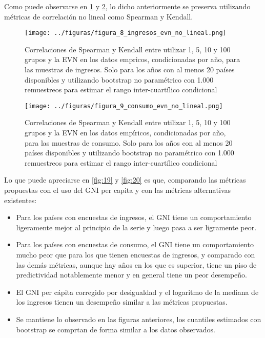 Como puede observarse en \ref{fig:8} y \ref{fig:9}, lo dicho anteriormente se preserva utilizando métricas de correlación no lineal como Spearman y Kendall.

\begin{figure}[H] %
    \centering %
    \texttt{[image: ../figuras/figura\_8\_ingresos\_evn\_no\_lineal.png]} %
    \caption{Correlaciones de Spearman y Kendall entre utilizar 1, 5, 10 y 100 grupos y la EVN en los datos empricos, condicionadas por año, para las muestras de ingresos. Solo para los años con al menos 20 países disponibles y utilizando bootstrap no paramétrico con 1.000 remuestreos para estimar el rango inter-cuartílico condicional}
    \label{fig:8} %
\end{figure}



\begin{figure}[H] %
    \centering %
    \texttt{[image: ../figuras/figura\_9\_consumo\_evn\_no\_lineal.png]} %
    \caption{Correlaciones de Spearman y Kendall entre utilizar 1, 5, 10 y 100 grupos y la EVN en los datos empíricos, condicionadas por año, para las muestras de consumo. Solo para los años con al menos 20 países disponibles y utilizando bootstrap no paramétrico con 1.000 remuestreos para estimar el rango inter-cuartílico condicional}
    \label{fig:9} %
\end{figure}

Lo que puede apreciarse en \ref{fig:19} y \ref{fig:20} es que, comparando las métricas propuestas con el uso del GNI per capita y con las métricas alternativas existentes:


\begin{itemize}
    \item  Para los países con encuestas de ingresos, el GNI tiene un comportamiento ligeramente mejor al principio de la serie y luego pasa a ser ligramente peor.
    \item Para los países con encuestas de consumo, el GNI tiene un comportamiento mucho peor que para los que tienen encuestas de ingresos, y comparado con las demás métricas, aunque hay años en los que es superior, tiene un piso de predictividad notablemente menor y en general tiene un peor desempeño.
    \item El GNI per cápita corregido por desigualdad y el logaritmo de la mediana de los ingresos tienen un desempeño similar a las métricas propuestas.
    \item Se mantiene lo observado en las figuras anteriores, los cuantiles estimados con bootstrap se comprtan de forma similar a los datos observados.
\end{itemize}


